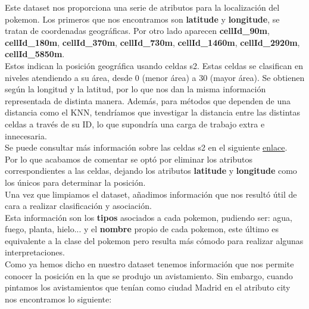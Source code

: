Este dataset nos proporciona una serie de atributos para la localización del pokemon. Los primeros que nos encontramos son \textbf{latitude} y \textbf{longitude}, se tratan de coordenadas geográficas. Por otro lado aparecen \textbf{cellId\_90m}, \textbf{cellId\_180m}, \textbf{cellId\_370m}, \textbf{cellId\_730m}, \textbf{cellId\_1460m}, \textbf{cellId\_2920m}, \textbf{cellId\_5850m}.\\

Estos indican la posición geográfica usando celdas s2. Estas celdas se clasifican en niveles atendiendo a su área, desde 0 (menor área) a 30 (mayor área). Se obtienen según la longitud y la latitud, por lo que nos dan la misma información representada de distinta manera. Además, para métodos que dependen de una distancia como el KNN, tendríamos que investigar la distancia entre las distintas celdas a través de su ID, lo que supondría una carga de trabajo extra e innecesaria.\\

Se puede consultar más información sobre las celdas s2 en el siguiente \href{http://blog.christianperone.com/2015/08/googles-s2-geometry-on-the-sphere-cells-and-hilbert-curve/}{enlace}.\\

Por lo que acabamos de comentar se optó por eliminar los atributos correspondientes a las celdas, dejando los atributos \textbf{latitude} y \textbf{longitude} como los únicos para determinar la posición.\\

Una vez que limpiamos el dataset, añadimos información que nos resultó útil de cara a realizar clasificación y asociación.\\

Esta información son los \textbf{tipos} asociados a cada pokemon, pudiendo ser: agua, fuego, planta, hielo... y el \textbf{nombre} propio de cada pokemon, este último es equivalente a la clase del pokemon pero resulta más cómodo para realizar algunas interpretaciones.\\

Como ya hemos dicho en nuestro dataset tenemos información que nos permite conocer la posición en la que se produjo un avistamiento. Sin embargo, cuando pintamos los avistamientos que tenían como ciudad Madrid en el atributo city nos encontramos lo siguiente:

